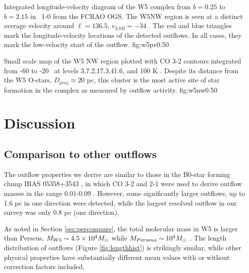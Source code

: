 {Integrated longitude-velocity diagram of the W5 complex from $b=0.25$ to
$b=2.15$ in \twelveco\ 1-0 from the FCRAO OGS.  The W5NW region is seen at a
distinct average velocity around $\ell=136.5$, $v_{LSR}=-34$ \kms.  The red and
blue triangles mark the longitude-velocity locations of the detected outflows.
In all cases, they mark the low-velocity start of the outflow.}
{fig:w5pv}{0.5}{0}


{Small scale map of the W5 NW region plotted with CO 3-2 contours integrated
from -60 to -20 \kms\ at levels 3,7.2,17.3,41.6, and 100 K \kms. Despite its
distance from the W5 O-stars, $D_{proj}\approx20$ pc, this cluster is the most
active site of star formation in the complex as measured by outflow activity.}
{fig:w5nw}{0.5}{0}

\section{Discussion}

\subsection{Comparison to other outflows}
\label{sec:comparison}
The outflow properties we derive are similar to those in the B0-star forming
clump IRAS 05358+3543 \citep[$M\approx600\msun$][]{Ginsburg2009}, in which CO
3-2 and 2-1 were used to derive outflow masses in the range 0.01-0.09 \msun.
However, some significantly larger outflows, up to 1.6 pc in one direction were
detected, while the largest resolved outflow in our survey was only 0.8 pc (one
direction).  

As noted in Section \ref{sec:percompare}, 
the total molecular mass in W5 is larger than
Perseus, $M_{W5}\sim 4.5\times10^{4} M_{\odot}$ while $M_{Perseus}\sim10^4M_{\odot}$
\citep{bally-perseus2008}.  The length distribution of outflows (Figure
\ref{fig:lengthhist}) is strikingly similar, while other physical properties
have substantially different mean values with or without correction factors
included.


